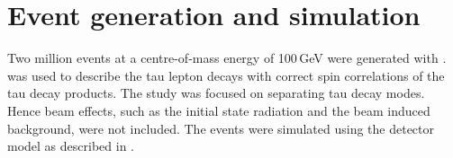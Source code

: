 \section{Event generation and simulation}
\label{sec:tauDecayModes}


Two million \eeToTauTau events at a centre-of-mass energy of 100\,GeV were generated with  \WHIZARD \cite{whizard}.  \TAUOLA \cite{Jadach:1993hs} was used to describe the tau lepton decays with correct spin correlations of the tau decay products. The study was focused on separating tau decay modes. Hence beam effects, such as the initial state radiation and the beam induced background, were not included. The \eeToTauTau events were simulated using the \ILD detector model as described in .




